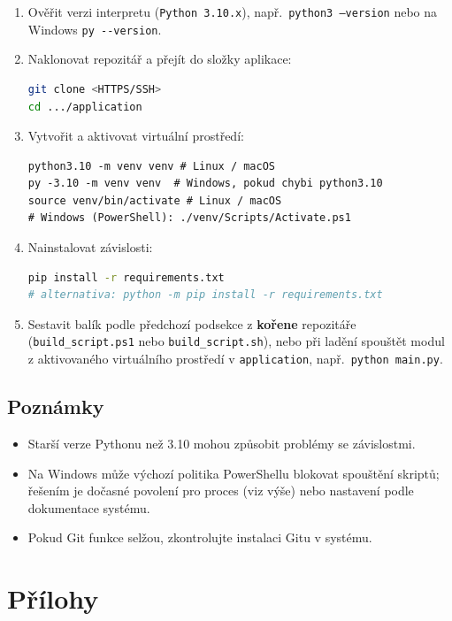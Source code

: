 \documentclass[12pt, a4paper]{article}
\begin{document}
\begin{enumerate}
    \item Ověřit verzi interpretu (\texttt{Python 3.10.x}), např.\ \texttt{python3 --version} nebo na Windows \texttt{py -{}-version}.
    \item Naklonovat repozitář a přejít do složky aplikace:
\begin{lstlisting}[language=bash, basicstyle=\ttfamily\small]
git clone <HTTPS/SSH>
cd .../application
\end{lstlisting}
    \item Vytvořit a aktivovat virtuální prostředí:
\begin{lstlisting}[basicstyle=\ttfamily\small]
python3.10 -m venv venv # Linux / macOS
py -3.10 -m venv venv  # Windows, pokud chybi python3.10
source venv/bin/activate # Linux / macOS
# Windows (PowerShell): ./venv/Scripts/Activate.ps1
\end{lstlisting}
    \item Nainstalovat závislosti:
\begin{lstlisting}[language=bash, basicstyle=\ttfamily\small]
pip install -r requirements.txt
# alternativa: python -m pip install -r requirements.txt
\end{lstlisting}
    \item Sestavit balík podle předchozí podsekce z \textbf{kořene} repozitáře 
    (\texttt{build\_script.ps1} nebo \texttt{build\_script.sh}), nebo při ladění spouštět modul 
    z aktivovaného virtuálního prostředí v \texttt{application}, např.\ \texttt{python main.py}.
\end{enumerate}

\subsection{Poznámky}

\begin{itemize}
    \item Starší verze Pythonu než 3.10 mohou způsobit problémy se závislostmi.
    \item Na Windows může výchozí politika PowerShellu blokovat spouštění skriptů; řešením je dočasné povolení pro proces (viz výše) nebo nastavení podle dokumentace systému.
    \item Pokud Git funkce selžou, zkontrolujte instalaci Gitu v systému.
\end{itemize}

\newpage
\appendix
\section{Přílohy}
\end{document}
